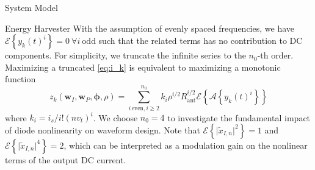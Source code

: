 \documentclass{IEEEtran}
\begin{document}
\begin{section}{System Model}
\begin{subsection}{Energy Harvester}
		With the assumption of evenly spaced frequencies, we have $\mathcal{E}\left\{y_k(t)^i\right\}=0 \ \forall i \ \mathrm{odd}$ such that the related terms has no contribution to DC components. For simplicity, we truncate the infinite series to the $n_0$-th order. Maximizing a truncated \ref{eq:i_k} is equivalent to maximizing a monotonic function \cite{Clerckx2016a}
		\begin{equation}\label{eq:z_k}
			z_k(\boldsymbol{w}_I,\boldsymbol{w}_P,\boldsymbol{\phi},\rho)=\sum_{i\,\text{even},i\ge2}^{n_0}{k_i}{\rho^{i/2}}{R_{\text{ant}}^{i/2}}{\mathcal{E}\left\{\mathcal{A}\left\{y_k(t)^i\right\}\right\}}
		\end{equation}
		where $k_i=i_s/i!(nv_t)^i$. We choose $n_0=4$ to investigate the fundamental impact of diode nonlinearity on waveform design. Note that $\mathcal{E}\left\{\lvert\tilde{x}_{I,n}\rvert^2\right\}=1$ and $\mathcal{E}\left\{\lvert\tilde{x}_{I,n}\rvert^4\right\}=2$, which can be interpreted as a modulation gain on the nonlinear terms of the output DC current.


\end{subsection}
\end{section}
\end{document}

